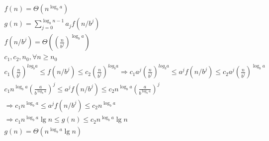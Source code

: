$$
  \begin{array}{l}
    f(n)=\Theta\left(n^{\log _{b} a}\right)                                                                                                                                                                                                                                                           \\
    g(n)=\sum_{j=0}^{\log _{b} n-1} a_{j} f\left(n / b^{j}\right)                                                                                                                                                                                                                                     \\
    f\left(n / b^{j}\right)=\Theta\left(\left(\frac{n}{b^{j}}\right)^{\log _{b} a}\right)                                                                                                                                                                                                             \\
    c_{1}, c_{2}, n_{0}, \forall n \geq n_{0}                                                                                                                                                                                                                                                         \\
    c_{1}\left(\frac{n}{b^{j}}\right)^{l o g_{b} a} \leq f\left(n / b^{j}\right) \leq c_{2}\left(\frac{n}{b^{j}}\right)^{l o g_{b} a} \Rightarrow c_{1} a^{j}\left(\frac{n}{b^{j}}\right)^{l o g_{b} a} \leq a^{j} f\left(n / b^{j}\right) \leq c_{2} a^{j}\left(\frac{n}{b^{j}}\right)^{\log _{b} a} \\
    c_{1} n^{\log _{b} a}\left(\frac{a}{b^{\log _{b} a}}\right)^{j} \leq a^{j} f\left(n / b^{j}\right) \leq c_{2} n^{\log _{b} a}\left(\frac{a}{b^{\log _{b} a}}\right)^{j}                                                                                                                           \\
    \Rightarrow c_{1} n^{\log _{b} a} \leq a^{j} f\left(n / b^{j}\right) \leq c_{2} n^{\log _{b} a}                                                                                                                                                                                                   \\
    \Rightarrow c_{1} n^{\log _{b} a} \lg n \leq g(n) \leq c_{2} n^{\log _{b} a} \lg n                                                                                                                                                                                                                \\
    g(n)=\Theta\left(n^{\log _{b} a} \lg n\right)
  \end{array}
$$


